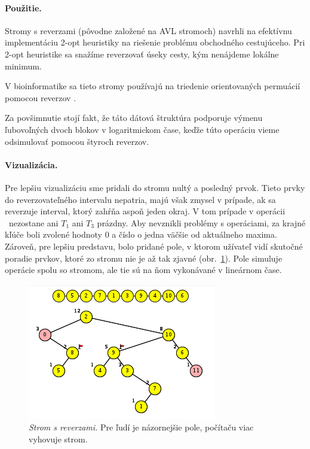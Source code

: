 \paragraph{Použitie.}
Stromy s reverzami (pôvodne založené na AVL stromoch) navrhli \citet{chrobak}
na efektívnu implementáciu 2-opt heuristiky na riešenie problému obchodného cestujúceho.
Pri 2-opt heuristike sa snažíme reverzovať úseky cesty, kým nenájdeme lokálne minimum.

V bioinformatike sa tieto stromy používajú na triedenie orientovaných permuácií
pomocou reverzov \citep{reversals,reversals2}.

Za povšimnutie stojí fakt, že táto dátová štruktúra podporuje výmenu ľubovoľných dvoch blokov
v logaritmickom čase, keďže túto operáciu vieme odsimulovať pomocou štyroch reverzov.

\paragraph{Vizualizácia.}
Pre lepšiu vizualizáciu sme pridali do stromu nultý a posledný prvok. Tieto prvky
do reverzovateľného intervalu nepatria, majú však zmysel v prípade, ak sa reverzuje
interval, ktorý zahŕňa aspoň jeden okraj. V tom prípade v operácii \reverse\ nezostane
ani $T_1$ ani $T_3$ prázdny. Aby nevznikli problémy s operáciami, za krajné kľúče boli
zvolené hodnoty $0$ a číslo o jedna väčšie od aktuálneho maxima. Zároveň, pre lepšiu
predstavu, bolo pridané pole, v ktorom užívateľ vidí skutočné poradie prvkov, ktoré
zo stromu nie je až tak zjavné (obr.~\ref{img:rev1}). Pole simuluje operácie spolu so stromom, ale tie sú
na ňom vykonávané v lineárnom čase.

\begin{figure}
\includegraphics[width=\columnwidth]{obrazky/reversal.png}
\caption{\emph{Strom s reverzami.} Pre ľudí je názornejšie pole, počítaču viac vyhovuje strom.}
\label{img:rev1}
\end{figure}
